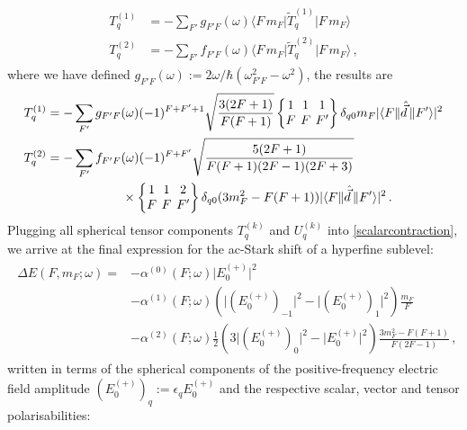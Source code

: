 \documentclass[../Thesis-IJspeert.tex]{subfiles}
\begin{document}
\begin{align}
\begin{split}
T^{(1)}_q&=-\sum_{F'} g_{F'F}(\omega) \langle F\, m_F \vert {\tilde{T}^{(1)}_q}  \vert F\, m_F \rangle\\ T^{(2)}_q&=-\sum_{F'} f_{F'F}(\omega) \langle F\, m_F \vert {\tilde{T}^{(2)}_q}  \vert F\, m_F \rangle\,,
\end{split}
\end{align}
where we have defined $g_{F'F}(\omega):= {2\omega }/{\hbar (\omega_{F' F}^2-\omega^2)}$, the results are
\begin{align}
\begin{split}
T^{(1)}_q&=-\sum_{F'} g_{F'F}(\omega) (-1)^{F+F'+1} \sqrt{\frac{3(2F+1)}{F(F+1)}} \tj{1}{1}{1}{F}{F}{F'} \delta_{q0} m_F  \lvert \langle{F}\| \hat{\vec{d}} \, \|{F'}\rangle\rvert^2\\ T^{(2)}_q&=-\sum_{F'} f_{F'F}(\omega) (-1)^{F+F'} \sqrt{\frac{5(2F+1)}{F(F+1)(2F-1)(2F+3)}}\\ &\hspace{6em} \times \tj{1}{1}{2}{F}{F}{F'} \delta_{q0} (3m_F^2-F(F+1)) \lvert \langle{F}\| \hat{\vec{d}} \, \|{F'}\rangle\rvert^2\,.
\end{split}
\end{align}
Plugging all spherical tensor components $T^{(k)}_q$ and $U^{(k)}_q$ into \autoref{scalarcontraction}, we arrive at the final expression for the ac-Stark shift of a hyperfine sublevel:
\begin{align}
\label{acStarkHyperfineShifts}
\begin{split}
	\Delta E\left(F,m_F;\omega\right) = &- \alpha^{(0)}\left(F;\omega\right) \lvert E_0^{(+)}\rvert ^2 \\&- \alpha^{(1)} \left(F;\omega\right)   \left( \lvert (E_0^{(+)})_{-1}\rvert ^2 - \lvert (E_0^{(+)})_{1}\rvert ^2  \right)    \frac{m_F}{F}   \\&- \alpha^{(2)}\left(F;\omega\right)\frac{1}{2}\left(3\lvert (E_{0}^{(+)})_0 \rvert ^2 - \lvert E_0^{(+)}\rvert ^2 \right) \frac{3m_F^2-F\left(F+1\right)}{F\left(2F-1\right)} \,,
\end{split}
\end{align}
written in terms of the spherical components of the positive-frequency electric field amplitude $(E_0^{(+)})_q:={\epsilon}_q E_0^{(+)}$ and the respective scalar, vector and tensor polarisabilities:
\end{document}
